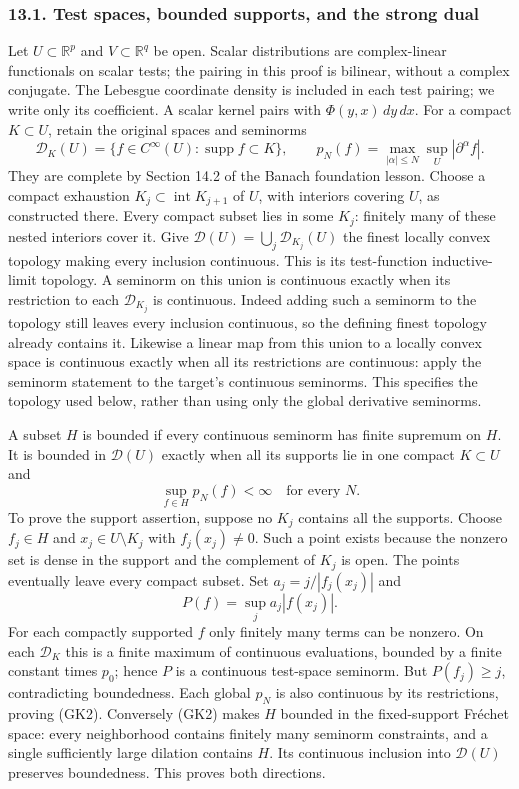 \documentclass[
  11pt,
]{article}
\begin{document}
\subsubsection{13.1. Test spaces, bounded supports, and the strong
dual}\label{test-spaces-bounded-supports-and-the-strong-dual}

Let \(U\subset\mathbb R^p\) and \(V\subset\mathbb R^q\) be open. Scalar
distributions are complex-linear functionals on scalar tests; the
pairing in this proof is bilinear, without a complex conjugate. The
Lebesgue coordinate density is included in each test pairing; we write
only its coefficient. A scalar kernel pairs with \(\Phi(y,x)\,dy\,dx\).
For a compact \(K\subset U\), retain the original spaces and seminorms
\[
 \mathcal D_K(U)=\{f\in C^\infty(U):\operatorname{supp}f\subset K\},
 \qquad p_N(f)=\max_{|\alpha|\leq N}\sup_U|\partial^\alpha f|.
 \tag{GK1}
\] They are complete by Section 14.2 of the Banach foundation lesson.
Choose a compact exhaustion \(K_j\subset\operatorname{int}K_{j+1}\) of
\(U\), with interiors covering \(U\), as constructed there. Every
compact subset lies in some \(K_j\): finitely many of these nested
interiors cover it. Give \(\mathcal D(U)=\bigcup_j\mathcal D_{K_j}(U)\)
the finest locally convex topology making every inclusion continuous.
This is its test-function inductive-limit topology. A seminorm on this
union is continuous exactly when its restriction to each
\(\mathcal D_{K_j}\) is continuous. Indeed adding such a seminorm to the
topology still leaves every inclusion continuous, so the defining finest
topology already contains it. Likewise a linear map from this union to a
locally convex space is continuous exactly when all its restrictions are
continuous: apply the seminorm statement to the target's continuous
seminorms. This specifies the topology used below, rather than using
only the global derivative seminorms.

A subset \(H\) is bounded if every continuous seminorm has finite
supremum on \(H\). It is bounded in \(\mathcal D(U)\) exactly when all
its supports lie in one compact \(K\subset U\) and \[
 \sup_{f\in H}p_N(f)<\infty \quad\text{for every }N.
 \tag{GK2}
\] To prove the support assertion, suppose no \(K_j\) contains all the
supports. Choose \(f_j\in H\) and \(x_j\in U\setminus K_j\) with
\(f_j(x_j)\ne0\). Such a point exists because the nonzero set is dense
in the support and the complement of \(K_j\) is open. The points
eventually leave every compact subset. Set \(a_j=j/|f_j(x_j)|\) and \[
 P(f)=\sup_j a_j|f(x_j)|.
 \tag{GK3}
\] For each compactly supported \(f\) only finitely many terms can be
nonzero. On each \(\mathcal D_K\) this is a finite maximum of continuous
evaluations, bounded by a finite constant times \(p_0\); hence \(P\) is
a continuous test-space seminorm. But \(P(f_j)\geq j\), contradicting
boundedness. Each global \(p_N\) is also continuous by its restrictions,
proving (GK2). Conversely (GK2) makes \(H\) bounded in the fixed-support
Fréchet space: every neighborhood contains finitely many seminorm
constraints, and a single sufficiently large dilation contains \(H\).
Its continuous inclusion into \(\mathcal D(U)\) preserves boundedness.
This proves both directions.
\end{document}
